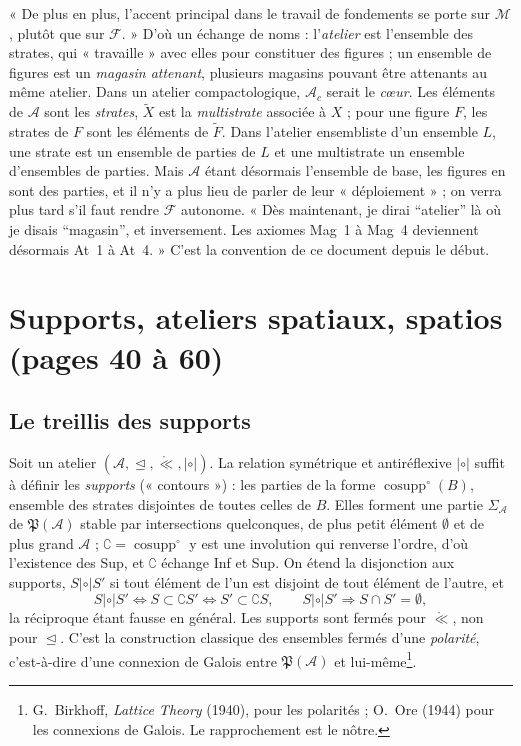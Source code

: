 \documentclass[11pt,a4paper]{article}
\begin{document}
« De plus en plus, l'accent principal dans le travail de fondements se porte sur
$\mathcal{M}$, plutôt que sur $\mathcal{F}$. » D'où un échange de noms :
l'\emph{atelier} est l'ensemble des strates, qui « travaille » avec elles pour
constituer des figures ; un ensemble de figures est un \emph{magasin attenant},
plusieurs magasins pouvant être attenants au même atelier. Dans un atelier
compactologique, $\mathcal{A}_{c}$ serait le \emph{cœur}. Les éléments de
$\mathcal{A}$ sont les \emph{strates}, $\widetilde{X}$ est la \emph{multistrate}
associée à $X$ ; pour une figure $F$, les strates de $F$ sont les éléments de
$\widetilde{F}$. Dans l'atelier ensembliste d'un ensemble $L$, une strate est un
ensemble de parties de $L$ et une multistrate un ensemble d'ensembles de
parties. Mais $\mathcal{A}$ étant désormais l'ensemble de base, les figures en
sont des parties, et il n'y a plus lieu de parler de leur « déploiement » ; on
verra plus tard s'il faut rendre $\mathcal{F}$ autonome. « Dès maintenant, je
dirai “atelier” là où je disais “magasin”, et inversement. Les axiomes Mag~1 à
Mag~4 deviennent désormais At~1 à At~4. » C'est la convention de ce document
depuis le début.

\section*{Supports, ateliers spatiaux, spatios (pages 40 à 60)}

\subsection*{Le treillis des supports}

Soit un atelier $(\mathcal{A}, \trianglelefteq, \mathrel{\mathring{\ll}},
\mathrel{|\circ|})$. La relation symétrique et antiréflexive
$\mathrel{|\circ|}$ suffit à définir les \emph{supports} (« contours ») : les
parties de la forme $\operatorname{cosupp}^{\circ}(B)$, ensemble des strates
disjointes de toutes celles de $B$. Elles forment une partie
$\Sigma_{\mathcal{A}}$ de $\mathfrak{P}(\mathcal{A})$ stable par intersections
quelconques, de plus petit élément $\emptyset$ et de plus grand $\mathcal{A}$ ;
$\complement = \operatorname{cosupp}^{\circ}$ y est une involution qui renverse
l'ordre, d'où l'existence des Sup, et $\complement$ échange Inf et Sup. On
étend la disjonction aux supports, $S \mathrel{|\circ|} S'$ si tout élément de
l'un est disjoint de tout élément de l'autre, et
\[
S \mathrel{|\circ|} S' \iff S \subset \complement S' \iff S' \subset \complement
S, \qquad S \mathrel{|\circ|} S' \Longrightarrow S \cap S' = \emptyset,
\]
la réciproque étant fausse en général. Les supports sont fermés pour
$\mathrel{\mathring{\ll}}$, non pour $\trianglelefteq$. C'est la construction
classique des ensembles fermés d'une \emph{polarité}, c'est-à-dire d'une
connexion de Galois entre $\mathfrak{P}(\mathcal{A})$ et lui-même\footnote{G.~Birkhoff,
\emph{Lattice Theory} (1940), pour les polarités ; O.~Ore (1944) pour les
connexions de Galois. Le rapprochement est le nôtre.}.
\end{document}
